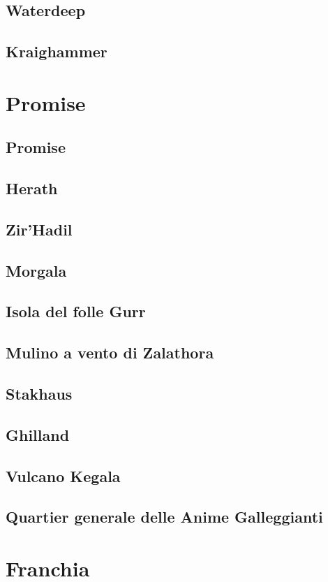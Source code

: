 \documentclass[letterpaper,twocolumn,openany,nodeprecatedcode]{dndbook}
\begin{document}
\section{Waterdeep}
\section{Kraighammer}

\chapter{Promise}
\section{Promise}
\section{Herath}
\section{Zir'Hadil}
\section{Morgala}
\section{Isola del folle Gurr}
\section{Mulino a vento di Zalathora}
\section{Stakhaus}
\section{Ghilland}
\section{Vulcano Kegala}
\section{Quartier generale delle Anime Galleggianti}

\chapter{Franchia}
\end{document}
